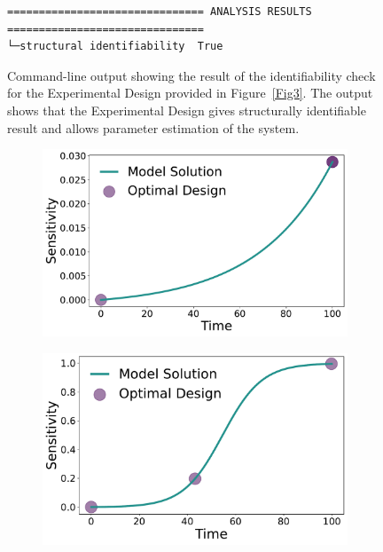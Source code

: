 \documentclass[graybox]{svmult}
\begin{document}
%
\begin{figure}
    \begin{verbatim}
=============================== ANALYSIS RESULTS ===============================
└─structural identifiability  True
    \end{verbatim}
    \caption{Command-line output showing the result of the identifiability check for the Experimental Design provided in Figure~\ref{Fig3}.
    The output shows that the Experimental Design gives structurally identifiable result and allows parameter estimation of the system.}
    \label{Fig6}
\end{figure}
%
%
\begin{figure}[H]
    \begin{subfigure}{.5\textwidth}
      \centering
      \includegraphics[scale=0.25]{Figures/Fig7a.pdf}
    \end{subfigure}
    \begin{subfigure}{.5\textwidth}
        \centering
        \includegraphics[scale=0.25]{Figures/Fig7b.pdf}

\end{subfigure}
\end{figure}
\end{document}
